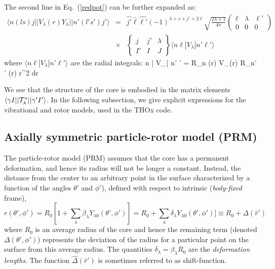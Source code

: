 \documentclass[preprint,12pt]{elsarticle}
\begin{document}
The second line in Eq.~(\ref{redpot}) can be further expanded as: 
\begin{eqnarray}
\langle n (ls)j || V_\lambda(r) Y_{\lambda } || n' (l's')j' \rangle  & =&  \hat{j'} \hat{\ell} \hat{\ell'} 
(-1)^{\lambda + s +j'+2 \ell} \sqrt{\frac{2\lambda+1}{4 \pi}} 
\left ( \begin{array}{ccc} \ell & \lambda & \ell' \\ 0 & 0  &  0   \end{array} \right )  \nonumber \\
& \times & 
\left\lbrace \begin{array}{ccc} j & j' & \lambda \\ I'& I & J  \end{array} \right\rbrace
\langle n \ell | V_\lambda | n' \ell' \rangle
\end{eqnarray}
where $\langle n \ell | V_\lambda | n' \ell' \rangle$ are the radial integrals:
\be
\langle n \ell | V_\lambda | n' \ell' \rangle = \int R_{n \ell }(r) V_{\lambda}(r) R_{n' \ell' }(r) r^2 dr
\ee
%

We see that the structure of the core is embodied in the matrix elements $\langle \gamma I || {\cal T}^{*}_{\lambda}|| \gamma' I' \rangle $. In the following subsection, we give explicit expressions for the vibrational and rotor models, used in the THOx code. 


\subsection{Axially symmetric particle-rotor model (PRM)}

The particle-rotor model (PRM) \cite{BM} assumes that the core has a permanent deformation, and hence  
its radius  will not be longer a constant. Instead, the distance from the center to an arbitrary  point in the surface characterized by a function of the  angles $\theta'$ and $\phi'$), defined with respect to  intrinsic (\textit{body-fixed} frame),
\begin{equation}
r(\theta', \phi')  =  R_0 [1  + \sum_{\lambda} {\beta}_{\lambda} Y_{\lambda 0}(\theta', \phi') ]
                   =  R_0  + \sum_{\lambda} {\delta}_{\lambda} Y_{\lambda 0}(\theta', \phi') ] 
                    \equiv  R_0 + \Delta(\hat{r}') 
\end{equation}
where $R_0$ is an average radius of the core and hence the remaining term (denoted  $\Delta(\theta',\phi')$) represents the deviation of the radius for a particular point on the surface from this average radius. The quantities $\delta_{\lambda} = \beta_\lambda R_0$ are the 
\textit{deformation lengths}. The function $\hat{\Delta}(\hat{r}')$ is sometimes referred to as shift-function. 
\end{document}
